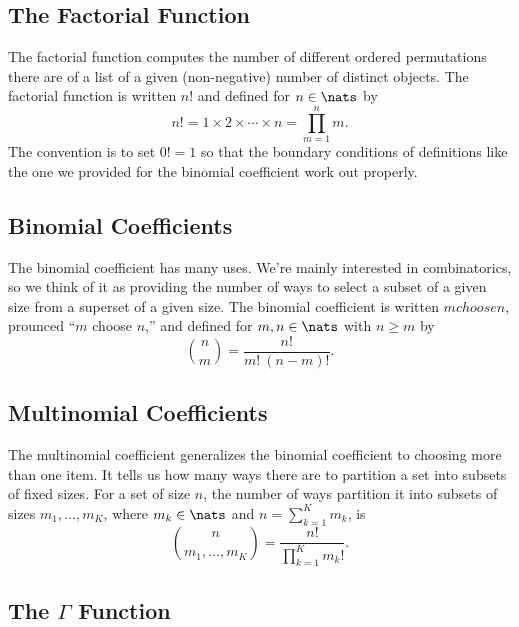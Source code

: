 \subsection{The Factorial Function}\label{section:stats-factorial}

The factorial function computes the number of different ordered
permutations there are of a list of a given (non-negative) number of
distinct objects.  The factorial function is written $n!$
and defined for $n \in \nats$ by
%
\begin{equation}
n! = 1 \times 2 \times \cdots \times n = \prod_{m=1}^n m.
\end{equation}
%
The convention is to set $0! = 1$ so that the boundary conditions of
definitions like the one we provided for the binomial coefficient work
out properly.


\subsection{Binomial Coefficients}\label{section:stats-binomial-coefficient}

The binomial coefficient has many uses.  We're mainly interested in
combinatorics, so we think of it as providing the number of ways to
select a subset of a given size from a superset of a given size.  The
binomial coefficient is written ${m choose n}$, prounced ``$m$
choose $n$,'' and defined for $m, n \in \nats$ with $n \geq m$ by
%
\begin{equation}
{n \choose m} = \frac{n!}{m! \ (n-m)!}.
\end{equation}


\subsection{Multinomial Coefficients}\label{section:maths-multinomial-coefficient}

The multinomial coefficient generalizes the binomial coefficient to
choosing more than one item.  It tells us how many ways there are to
partition a set into subsets of fixed sizes.  For a set of size $n$,
the number of ways partition it into subsets of sizes
$m_1,\ldots,m_K$, where $m_k \in \nats$ and $n = \sum_{k=1}^K m_k$, is
%
\begin{equation}
{n \choose {m_1, \ldots, m_K}}
= \frac{n!}{\prod_{k=1}^K m_k!}.
\end{equation}


\subsection{The $\Gamma$ Function}\label{section:stats-gamma-function}

